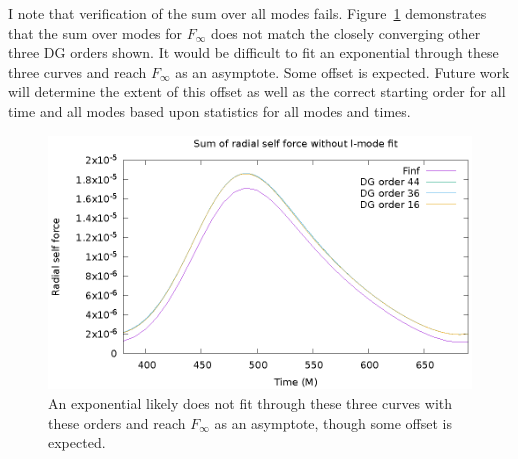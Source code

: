 I note that verification of the sum over all modes fails. Figure~\ref{unextrapsumcompareDG} demonstrates that the sum over modes for $F_\infty$ does not match the closely converging other three DG orders shown. It would be difficult to fit an exponential through these three curves and reach $F_\infty$ as an asymptote. Some offset is expected. Future work will determine the extent of this offset as well as the correct starting order for all time and all modes based upon statistics for all modes and times. 

\begin{figure}
\includegraphics{unextrapsumcompareDG}
\caption{An exponential likely does not fit through these three curves with these orders and reach $F_\infty$ as an asymptote, though some offset is expected.}
\label{unextrapsumcompareDG}
\end{figure}


